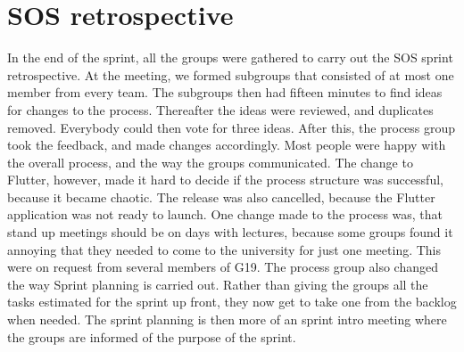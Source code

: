 \section{SOS retrospective}
In the end of the sprint, all the groups were gathered to carry out the SOS sprint retrospective. 
At the meeting, we formed subgroups that consisted of at most one member from every team. 
The subgroups then had fifteen minutes to find ideas for changes to the process. 
Thereafter the ideas were reviewed, and duplicates removed. Everybody could then vote for three ideas. 
After this, the process group took the feedback, and made changes accordingly. 
Most people were happy with the overall process, and the way the groups communicated. 
The change to Flutter, however, made it hard to decide if the process structure was successful, because it became chaotic.
The release was also cancelled, because the Flutter application was not ready to launch. 
One change made to the process was, that stand up meetings should be on days with lectures, because some groups found it annoying that they needed to come to the university for just one meeting.
This were on request from several members of G19. 
The process group also changed the way Sprint planning is carried out.
Rather than giving the groups all the tasks estimated for the sprint up front, they now get to take one from the backlog when needed. 
The sprint planning is then more of an sprint intro meeting where the groups are informed of the purpose of the sprint. 
